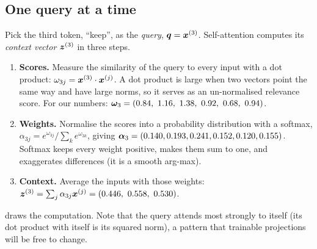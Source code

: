 \subsection{One query at a time}
Pick the third token, ``keep'', as the \emph{query}, $\bm{q}=\bm{x}^{(3)}$. Self-attention
computes its \emph{context vector} $\bm{z}^{(3)}$ in three steps.
\begin{enumerate}
  \item \textbf{Scores.} Measure the similarity of the query to every input with a dot product:
  $\omega_{3j} = \bm{x}^{(3)}\cdot\bm{x}^{(j)}$. A dot product is large when two vectors point the
  same way and have large norms, so it serves as an un-normalised relevance score. For our numbers:
  $\vect{\omega}_3 = (0.84,\ 1.16,\ 1.38,\ 0.92,\ 0.68,\ 0.94)$.
  \item \textbf{Weights.} Normalise the scores into a probability distribution with a softmax,
  $\alpha_{3j} = e^{\omega_{3j}}/\sum_k e^{\omega_{3k}}$, giving
  $\bm{\alpha}_3 = (0.140, 0.193, 0.241, 0.152, 0.120, 0.155)$. Softmax keeps every weight positive,
  makes them sum to one, and exaggerates differences (it is a smooth arg-max).
  \item \textbf{Context.} Average the inputs with those weights:
  $\bm{z}^{(3)} = \sum_j \alpha_{3j}\bm{x}^{(j)} = (0.446,\ 0.558,\ 0.530)$.
\end{enumerate}
 draws the computation. Note that the query attends most strongly to
itself (its dot product with itself is its squared norm), a pattern that trainable projections
will be free to change.

